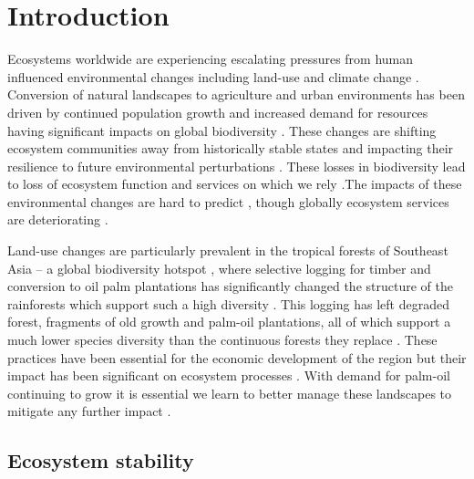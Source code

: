 
\section{Introduction}

Ecosystems worldwide are experiencing escalating pressures from human influenced environmental changes including land-use and climate change \citep{Hautier2015}. Conversion of natural landscapes to agriculture and urban environments has been driven by continued population growth and increased demand for resources \citep{Green2005, Foley2005} having significant impacts on global biodiversity \citep{Pimm1995}. These changes are shifting ecosystem communities away from historically stable states \citep{Hautier2015} and impacting their resilience to future environmental perturbations \citep{Oliver2015}. These losses in biodiversity lead to loss of ecosystem function and services on which we rely \citep{Diaz2006, MillenniumEcosystemAssessment2005}.The impacts of these environmental changes are hard to predict \citep{Carpenter2009}, though globally ecosystem services are deteriorating \citep{Mace2012}.

Land-use changes are particularly prevalent in the tropical forests of Southeast Asia – a global biodiversity hotspot \citep{DeBruyn2014},  where selective logging for timber and conversion to oil palm plantations has significantly changed the structure of the rainforests which support such a high diversity \citep{Gibson2011}. This logging has left degraded forest, fragments of old growth and palm-oil plantations, all of which support a much lower species diversity than the continuous forests they replace \citep{Fitzherbert2008, Haddad2015} . These practices have been essential for the economic development of the region \citep{Basiron2007} but their impact has been significant on ecosystem processes \citep{Koh2011, Schleuning2011, Ewers2015}.  With demand for palm-oil continuing to grow it is essential we learn to better manage these landscapes to mitigate any further impact \citep{Turner2008}.

\subsection{Ecosystem stability}

